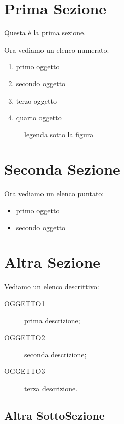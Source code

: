 \documentclass[12pt,a4paper,openright,twoside]{report}
\begin{document}
\section{Prima Sezione} %
Questa \`e la prima sezione.


Ora vediamo un elenco numerato: %
\begin{enumerate}
\item primo oggetto
\item secondo oggetto
\item terzo oggetto
\item quarto oggetto
\end{enumerate}

\begin{figure}[h] %
\begin{center} %

\caption[legenda elenco figure]{legenda sotto la figura}\label{fig:prima}
\end{center}
\end{figure}


\section{Seconda Sezione}
Ora vediamo un elenco puntato:
\begin{itemize} %
\item primo oggetto
\item secondo oggetto
\end{itemize}


\section{Altra Sezione}
Vediamo un elenco descrittivo:

\begin{description} %
  \item[OGGETTO1] prima descrizione;
  \item[OGGETTO2] seconda descrizione;
  \item[OGGETTO3] terza descrizione.
\end{description}


\subsection{Altra SottoSezione}
\end{document}
